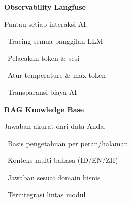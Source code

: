 \documentclass[a4paper]{article}
\begin{document}
\noindent
\begin{minipage}[t]{0.485\textwidth}
    \colorbox{OrangePrimary}{%
        \begin{minipage}{\dimexpr\textwidth-2\fboxsep\relax}
            {\fontsize{10}{13}\selectfont\bfseries\color{White} Observability Langfuse}
        \end{minipage}}\par
    \vspace{4pt}
    {\fontsize{9}{12}\selectfont\color{TextDark}%
    Pantau setiap interaksi AI.\par\vspace{3pt}
    \textbullet\ Tracing semua panggilan LLM\par\vspace{2pt}%
    \textbullet\ Pelacakan token \& sesi\par\vspace{2pt}%
    \textbullet\ Atur temperature \& max token\par\vspace{2pt}%
    \textbullet\ Transparansi biaya AI}%

\end{minipage}%
\hfill
\begin{minipage}[t]{0.485\textwidth}
    \colorbox{EmeraldDark}{%
        \begin{minipage}{\dimexpr\textwidth-2\fboxsep\relax}
            {\fontsize{10}{13}\selectfont\bfseries\color{White} RAG Knowledge Base}
        \end{minipage}}\par
    \vspace{4pt}
    {\fontsize{9}{12}\selectfont\color{TextDark}%
    Jawaban akurat dari data Anda.\par\vspace{3pt}
    \textbullet\ Basis pengetahuan per peran/halaman\par\vspace{2pt}%
    \textbullet\ Konteks multi-bahasa (ID/EN/ZH)\par\vspace{2pt}%
    \textbullet\ Jawaban sesuai domain bisnis\par\vspace{2pt}%
    \textbullet\ Terintegrasi lintas modul}%

\end{minipage}

\vspace{8pt}
\end{document}
